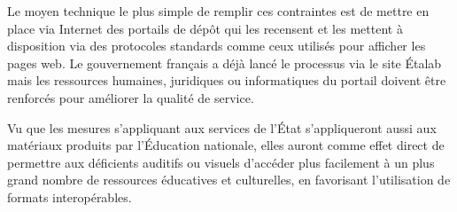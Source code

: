 Le moyen technique le plus simple de remplir ces contraintes est de mettre en place via Internet des portails de dépôt qui les recensent et les mettent à disposition via des protocoles standards comme ceux utilisés pour afficher les pages web. Le gouvernement français a déjà lancé le processus via le site Étalab mais les ressources humaines, juridiques ou informatiques du portail doivent être renforcés pour améliorer la qualité de service. 

Vu que les mesures s'appliquant aux services de l'État s'appliqueront aussi aux matériaux produits par l'Éducation nationale, elles auront comme effet direct de permettre aux déficients auditifs ou visuels d'accéder plus facilement à un plus grand nombre de ressources éducatives et culturelles, en favorisant l'utilisation de formats interopérables.


